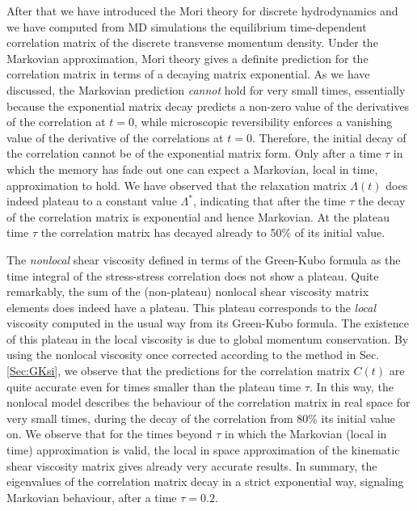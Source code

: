 \documentclass[b5paper,openright,10pt]{book}
\begin{document}
After that we have introduced the Mori theory for discrete hydrodynamics and we  have computed from  MD simulations  the equilibrium
time-dependent correlation matrix of  the discrete transverse momentum
density.   Under  the Markovian  approximation,  Mori  theory gives  a
definite prediction for the correlation  matrix in terms of a decaying
matrix exponential.   As we  have discussed, the  Markovian prediction
\textit{cannot}  hold for  very small  times, essentially  because the
exponential matrix decay predicts a  non-zero value of the derivatives
of the correlation at  $t=0$, while microscopic reversibility enforces
a  vanishing value  of the  derivative of  the correlations  at $t=0$.
Therefore,  the initial  decay of  the  correlation cannot  be of  the
exponential matrix form.  Only after a time $\tau$ in which the memory
has fade out one can expect  a Markovian, local in time, approximation
to hold.   We have  observed that  the relaxation  matrix $\Lambda(t)$
does indeed plateau  to a constant value  $\Lambda^*$, indicating that
after  the  time  $\tau$  the  decay  of  the  correlation  matrix  is
exponential  and hence  Markovian.   At the  plateau  time $\tau$  the
correlation matrix has decayed already to 50\% of its initial value.

The  \textit{nonlocal}  shear  viscosity  defined  in  terms  of  the
Green-Kubo  formula   as  the  time  integral   of  the  stress-stress
correlation does not show a plateau.  Quite remarkably, the sum of the
(non-plateau) nonlocal  shear viscosity  matrix elements  does indeed
have  a  plateau.   This  plateau corresponds  to  the  \textit{local}
viscosity computed in  the usual way from its  Green-Kubo formula. The
existence of  this plateau  in the  local viscosity  is due  to global
momentum  conservation.  By  using the  nonlocal viscosity 
once corrected  according to the  method in Sec. \ref{Sec:GKsi}, we  observe that
the predictions for  the correlation matrix $C(t)$  are quite accurate
even for times smaller than the  plateau time $\tau$. In this way, the
nonlocal model describes  the behaviour of the  correlation matrix in
real space for  very small times, during the decay  of the correlation
from 80\% its  initial value on. We observe that  for the times beyond
$\tau$ in which the Markovian  (local in time) approximation is valid,
the  local in  space approximation  of the  kinematic shear  viscosity
matrix gives already very accurate results.
In  summary, the  eigenvalues of  the  correlation matrix  decay in  a
strict exponential  way, signaling  Markovian behaviour, after  a time
$\tau=0.2$. 
\end{document}

